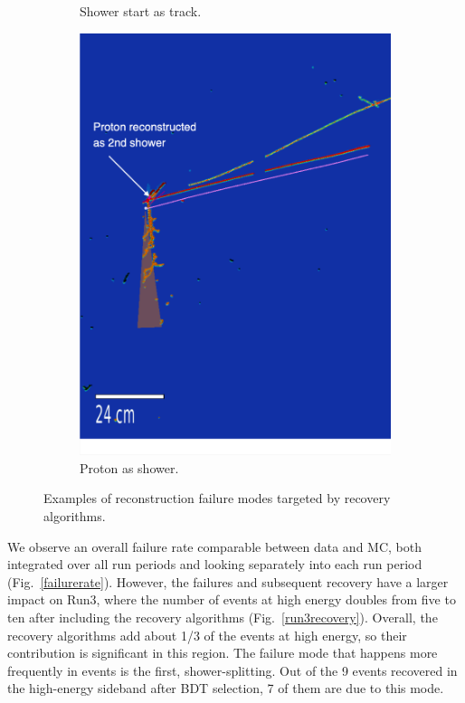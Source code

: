 \begin{figure}[H]
\begin{subfigure}{0.35\textwidth}
    \caption{\label{fig:recoveryalgos:split}Shower start as track.}
    \end{subfigure}
    \begin{subfigure}{0.35\textwidth}
    \includegraphics[width=1.00\textwidth]{Sidebands/Figures/CutUpdates/proton-as-shower.pdf}
    \caption{\label{fig:recoveryalgos:spurious}Proton as shower.}
    \end{subfigure}
    \caption{Examples of reconstruction failure modes targeted by recovery algorithms.}
    \label{fig:recoveryalgos}
\end{figure}

We observe an overall failure rate comparable between data and MC, both integrated over all run periods and looking separately into each run period (Fig.~\ref{failurerate}). However, the failures and subsequent recovery have a larger impact on Run3, where the number of events at high energy doubles from five to ten after including the recovery algorithms (Fig.~\ref{run3recovery}). Overall, the recovery algorithms add about 1/3 of the events at high energy, so their contribution is significant in this region. The failure mode that happens more frequently in \npsel events is the first, shower-splitting. Out of the 9 events recovered in the high-energy sideband after BDT selection, 7 of them are due to this mode. 


